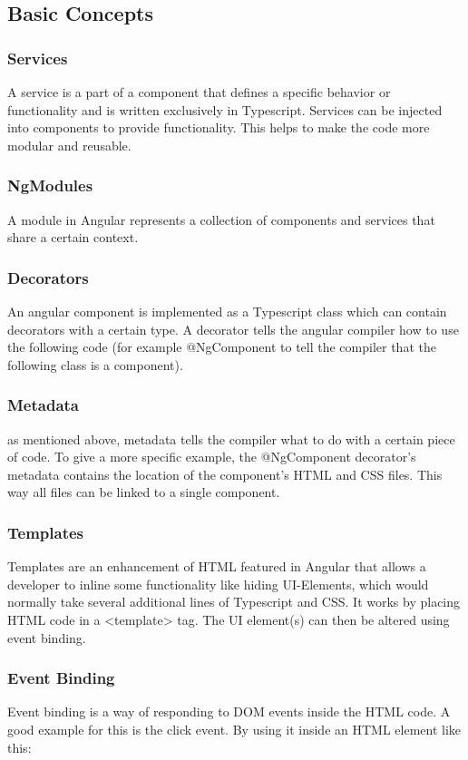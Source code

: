 \subsection {Basic Concepts}

\subsubsection {Services}
A service is a part of a component that defines a specific behavior or functionality and is written exclusively in Typescript. Services can be injected into components to provide functionality. This helps to make the code more modular and reusable.

\subsubsection{NgModules}
A module in Angular represents a collection of components and services that share a certain context.

\subsubsection{Decorators}
An angular component is implemented as a Typescript class which can contain decorators with a certain type. A decorator tells the angular compiler how to use the following code (for example @NgComponent to tell the compiler that the following class is a component).

\subsubsection{Metadata}
as mentioned above, metadata tells the compiler what to do with a certain piece of code. To give a more specific example, the @NgComponent decorator’s metadata contains the location of the component’s HTML and CSS files. This way all files can be linked to a single component.

\subsubsection{Templates}
Templates are an enhancement of HTML featured in Angular that allows a developer to inline some functionality like hiding UI-Elements, which would normally take several additional lines of Typescript and CSS. It works by placing HTML code in a <template> tag. The UI element(s) can then be altered using event binding.

\subsubsection{Event Binding}
Event binding is a way of responding to DOM events inside the HTML code. A good example for this is the click event. By using it inside an HTML element like this:

